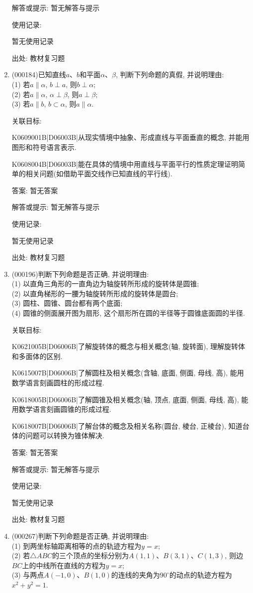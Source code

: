 \documentclass[10pt,a4paper]{article}
\begin{document}
\begin{enumerate}[1.]
解答或提示: 暂无解答与提示

使用记录:

暂无使用记录


出处: 教材复习题
\item { (000184)}已知直线$a$、$b$和平面$\alpha$、$\beta$, 判断下列命题的真假, 并说明理由:\\
(1) 若$a\parallel \alpha$, $b\perp a$, 则$b\perp \alpha$;\\
(2) 若$a\parallel \alpha$, $\alpha\perp \beta$, 则$a\perp \beta$;\\
(3) 若$a\parallel b$, $b\subset\alpha$, 则$a\parallel \alpha$.


关联目标:

K0609001B|D06003B|从现实情境中抽象、形成直线与平面垂直的概念, 并能用图形和符号语言表示.

K0608004B|D06003B|能在具体的情境中用直线与平面平行的性质定理证明简单的相关问题(如借助平面交线作已知直线的平行线).

答案: 暂无答案

解答或提示: 暂无解答与提示

使用记录:

暂无使用记录


出处: 教材复习题
\item { (000196)}判断下列命题是否正确, 并说明理由:\\
(1) 以直角三角形的一直角边为轴旋转所形成的旋转体是圆锥;\\
(2) 以直角梯形的一腰为轴旋转所形成的旋转体是圆台;\\
(3) 圆柱、圆锥、圆台都有两个底面;\\
(4) 圆锥的侧面展开图为扇形, 这个扇形所在圆的半径等于圆锥底面圆的半径.


关联目标:

K0621005B|D06006B|了解旋转体的概念与相关概念(轴, 旋转面), 理解旋转体和多面体的区别.

K0615007B|D06006B|了解圆柱及相关概念(含轴, 底面, 侧面, 母线, 高), 能用数学语言刻画圆柱的形成过程.

K0618005B|D06006B|了解圆锥及相关概念(轴, 顶点, 底面, 侧面, 母线, 高), 能用数学语言刻画圆锥的形成过程.

K0618007B|D06006B|了解台体的概念及相关名称(圆台, 棱台, 正棱台), 知道台体的问题可以转换为锥体解决.

答案: 暂无答案

解答或提示: 暂无解答与提示

使用记录:

暂无使用记录


出处: 教材复习题
\item { (000267)}判断下列命题是否正确, 并说明理由:\\
(1) 到两坐标轴距离相等的点的轨迹方程为$y=x$;\\
(2) 若$\triangle ABC$的三个顶点的坐标分别为$A(1, 1)$、$B(3, 1)$、$C(1, 3)$, 则边$BC$上的中线所在直线的方程为$y=x$;\\
(3) 与两点$A(-1, 0)$、$B(1, 0)$的连线的夹角为$90^\circ$的动点的轨迹方程为$x^2+y^2=1$.



\end{enumerate}
\end{document}
